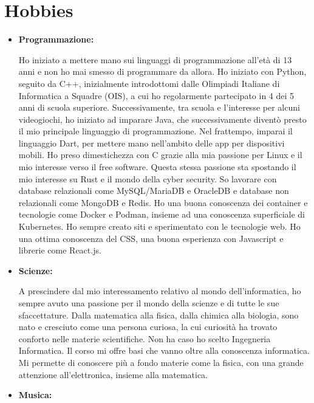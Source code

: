 \documentclass{paper}
\begin{document}
\section{Hobbies}

\begin{itemize}
    \item \textbf{Programmazione:}
    
    Ho iniziato a mettere mano sui linguaggi di
    programmazione all'età di 13 anni e non ho mai smesso di
    programmare da allora. Ho iniziato con Python,
    seguito da C++, inizialmente introdottomi dalle Olimpiadi
    Italiane di Informatica a Squadre (OIS), a cui ho
    regolarmente partecipato in 4 dei 5 anni di scuola
    superiore. Successivamente, tra scuola e l'interesse
    per alcuni videogiochi, ho iniziato ad imparare Java,
    che successivamente diventò presto il mio principale
    linguaggio di programmazione. Nel frattempo, imparai
    il linguaggio Dart, per mettere mano nell'ambito delle
    app per dispositivi mobili. Ho preso dimestichezza con
    C grazie alla mia passione per Linux e il mio interesse
    verso il free software. Questa stessa passione sta spostando
    il mio interesse su Rust e il mondo della cyber security.
    So lavorare con database relazionali come MySQL/MariaDB
    e OracleDB e database non relazionali come MongoDB e Redis.
    Ho una buona conoscenza dei container e tecnologie come
    Docker e Podman, insieme ad una conoscenza superficiale di
    Kubernetes. Ho sempre creato siti e sperimentato con le
    tecnologie web. Ho una ottima conoscenza del CSS, una buona
    esperienza con Javascript e librerie come React.js.

    \item \textbf{Scienze:}
    
    A prescindere dal mio interessamento relativo al mondo
    dell'informatica, ho sempre avuto una passione per il mondo
    della scienze e di tutte le sue sfaccettature. Dalla
    matematica alla fisica, dalla chimica alla biologia, sono
    nato e cresciuto come una persona curiosa, la cui curiosità
    ha trovato conforto nelle materie scientifiche. Non ha caso
    ho scelto Ingegneria Informatica. Il corso mi offre basi
    che vanno oltre alla conoscenza informatica. Mi permette
    di conoscere più a fondo materie come la fisica, con una
    grande attenzione all'elettronica, insieme alla matematica.

    \item \textbf{Musica:}
    

\end{itemize}
\end{document}
